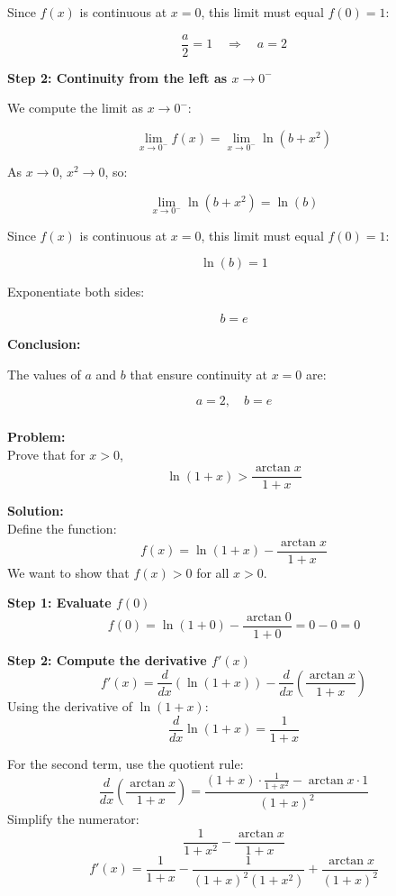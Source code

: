 \documentclass{article}
\begin{document}
	Since \( f(x) \) is continuous at \( x = 0 \), this limit must equal \( f(0) = 1 \):
	
	\[
	\frac{a}{2} = 1 \quad \Rightarrow \quad a = 2
	\]
	
	\textbf{Step 2: Continuity from the left as \( x \to 0^- \)}
	
	We compute the limit as \( x \to 0^- \):
	
	\[
	\lim_{x \to 0^-} f(x) = \lim_{x \to 0^-} \ln(b + x^2)
	\]
	
	As \( x \to 0 \), \( x^2 \to 0 \), so:
	
	\[
	\lim_{x \to 0^-} \ln(b + x^2) = \ln(b)
	\]
	
	Since \( f(x) \) is continuous at \( x = 0 \), this limit must equal \( f(0) = 1 \):
	
	\[
	\ln(b) = 1
	\]
	
	Exponentiate both sides:
	
	\[
	b = e
	\]
	
	\textbf{Conclusion:}
	
	The values of \( a \) and \( b \) that ensure continuity at \( x = 0 \) are:
	
	\[
	a = 2, \quad b = e
	\]

			\subsubsection{}
	
	
	
		

	
	\textbf{Problem:} \\
	Prove that for \(x > 0\),
	\[
	\ln(1+x) > \frac{\arctan x}{1+x}
	\]
	
	\textbf{Solution:} \\
	
	Define the function:
	\[
	f(x) = \ln(1+x) - \frac{\arctan x}{1+x}
	\]
	We want to show that \(f(x) > 0\) for all \(x > 0\).
	
	\textbf{Step 1: Evaluate \(f(0)\)} \\
	\[
	f(0) = \ln(1+0) - \frac{\arctan 0}{1+0}
	= 0 - 0 = 0
	\]
	
	\textbf{Step 2: Compute the derivative \(f'(x)\)} \\
	\[
	f'(x) = \frac{d}{dx} \left( \ln(1+x) \right) - \frac{d}{dx} \left( \frac{\arctan x}{1+x} \right)
	\]
	Using the derivative of \(\ln(1+x)\):
	\[
	\frac{d}{dx} \ln(1+x) = \frac{1}{1+x}
	\]
	
	For the second term, use the quotient rule:
	\[
	\frac{d}{dx} \left( \frac{\arctan x}{1+x} \right) = \frac{(1+x) \cdot \frac{1}{1+x^2} - \arctan x \cdot 1}{(1+x)^2}
	\]
	Simplify the numerator:
	\[
	\frac{1}{1+x^2} - \frac{\arctan x}{1+x}
	\]
	\[
	f'(x) = \frac{1}{1+x} - \frac{1}{(1+x)^2(1+x^2)} + \frac{\arctan x}{(1+x)^2}
	\]
	
\end{document}
